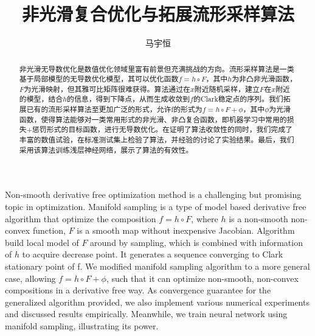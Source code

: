 \documentclass[macfonts]{njuthesis}
\title{非光滑复合优化与拓展流形采样算法}
\author{马宇恒}
\begin{document}
\maketitle
\makeenglishtitle
\controlpage 

\begin{abstract}

非光滑无导数优化是数值优化领域里富有前景但充满挑战的方向。流形采样算法是一类基于局部模型的无导数优化模型，其可以优化函数$f=h\circ F$，其中$h$为非凸非光滑函数，$F$为光滑映射，但其雅可比矩阵很难获得。算法通过在$x$附近随机采样，建立$F$在$x$附近的模型，结合$h$的信息，得到下降点，从而生成收敛到$f$的Clark稳定点的序列。我们拓展已有的流形采样算法至更加广泛的形式，允许f的形式为$f=h\circ F+\phi$，其中$\phi$为光滑函数，使得算法能够对一类常用形式的非光滑、非凸复合函数，即机器学习中常用的损失+惩罚形式的目标函数，进行无导数优化。在证明了算法收敛性的同时，我们完成了丰富的数值试验，在标准测试集上检验了算法，并经验的讨论了实验结果。最后，我们采用该算法训练浅层神经网络，展示了算法的有效性。

\end{abstract}

\begin{englishabstract}
Non-smooth derivative free optimization method is a challenging but promising topic in optimization. Manifold sampling is a type of model based derivative free algorithm that optimize the composition $f=h\circ F$, where $h$ is a non-smooth non-convex function, $F$ is a smooth map without inexpensive Jacobian. Algorithm build local model of $F$ around by sampling, which is combined with information of $h$ to acquire decrease point. It generates a sequence converging to Clark stationary point of f. We modified manifold sampling algorithm to a more general case, allowing $f=h\circ F+\phi$, such that it can optimize non-smooth, non-convex compositions in a derivative free way. As convergence guarantee for the generalized algorithm provided, we also implement various numerical experiments and discussed results empirically. Meanwhile, we train neural network using manifold sampling, illustrating its power.
\end{englishabstract}
\end{document}
